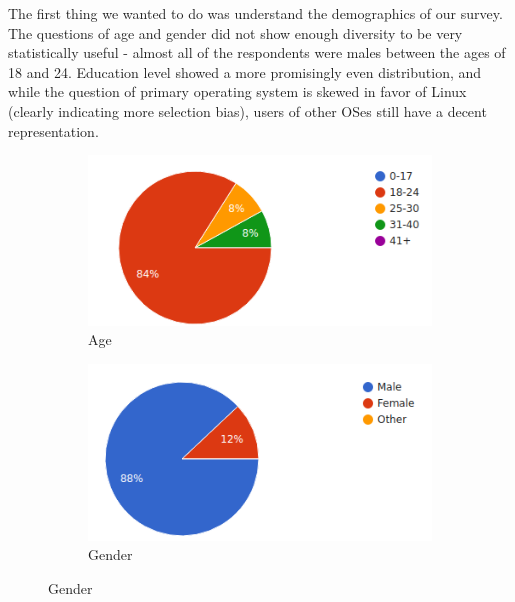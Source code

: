 The first thing we wanted to do was understand the demographics of our survey.
The questions of age and gender did not show enough diversity to be very
statistically useful \-- almost all of the respondents were males between the
ages of 18 and 24. Education level showed a more promisingly even distribution,
and while the question of primary operating system is skewed in favor of Linux
(clearly indicating more selection bias), users of other OSes still have a
decent representation.

\begin{figure}[ht]
  \centering
  \begin{subfigure}[b]{0.45\textwidth}
    \includegraphics[width=\textwidth]{figures/stats/age.png}
    \caption{Age}
    \label{fig:age}
  \end{subfigure}
  \quad
  \begin{subfigure}[b]{0.45\textwidth}
    \label{fig:gender}
    \includegraphics[width=\textwidth]{figures/stats/gender.png}
    \caption{Gender}
  \end{subfigure}


\end{figure}
